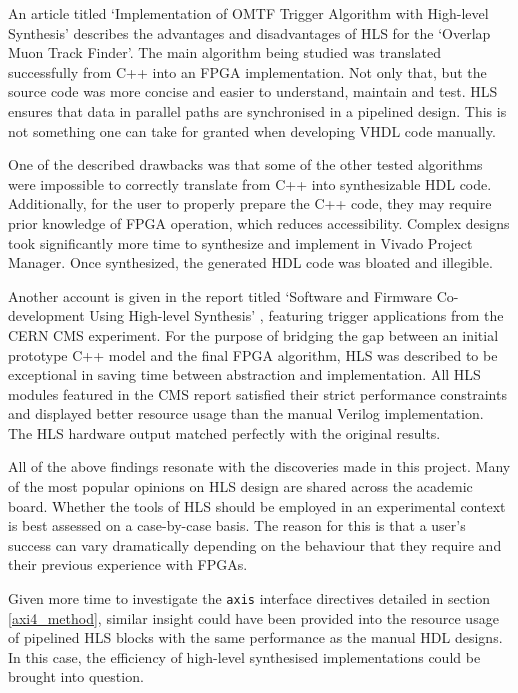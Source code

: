 \documentclass[10pt]{article}
\begin{document}
An article titled `Implementation of OMTF Trigger Algorithm with High-level Synthesis' \cite{zabolotny2019implementation} describes the advantages and disadvantages of HLS for the `Overlap Muon Track Finder'. The main algorithm being studied was translated successfully from C++ into an FPGA implementation. Not only that, but the source code was more concise and easier to understand, maintain and test. HLS ensures that data in parallel paths are synchronised in a pipelined design. This is not something one can take for granted when developing VHDL code manually.

One of the described drawbacks was that some of the other tested algorithms were impossible to correctly translate from C++ into synthesizable HDL code. Additionally, for the user to properly prepare the C++ code, they may require prior knowledge of FPGA operation, which reduces accessibility. Complex designs took significantly more time to synthesize and implement in Vivado Project Manager. Once synthesized, the generated HDL code was bloated and illegible.

Another account is given in the report titled `Software and Firmware Co-development Using High-level Synthesis' \cite{ghanathe2017software}, featuring trigger applications from the CERN CMS experiment. For the purpose of bridging the gap between an initial prototype C++ model and the final FPGA algorithm, HLS was described to be exceptional in saving time between abstraction and implementation.  All HLS modules featured in the CMS report satisfied their strict performance constraints and displayed better resource usage than the manual Verilog implementation. The HLS hardware output matched perfectly with the original results.

All of the above findings resonate with the discoveries made in this project. Many of the most popular opinions on HLS design are shared across the academic board. Whether the tools of HLS should be employed in an experimental context is best assessed on a case-by-case basis. The reason for this is that a user's success can vary dramatically depending on the behaviour that they require and their previous experience with FPGAs.

Given more time to investigate the \texttt{axis} interface directives detailed in section \ref{axi4_method}, similar insight could have been provided into the resource usage of pipelined HLS blocks with the same performance as the manual HDL designs. In this case, the efficiency of high-level synthesised implementations could be brought into question.
\end{document}
